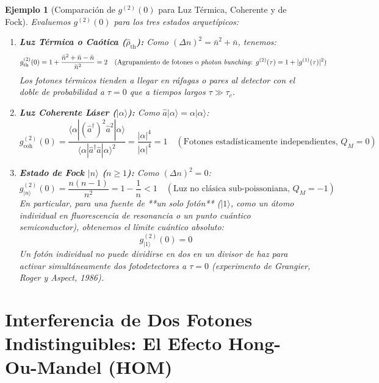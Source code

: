 \documentclass[11pt,a4paper]{book}
\newtheorem{ejemplo}{Ejemplo}[chapter]
\begin{document}
\begin{ejemplo}[Comparación de $g^{(2)}(0)$ para Luz Térmica, Coherente y de Fock]
Evaluemos $g^{(2)}(0)$ para los tres estados arquetípicos:
\begin{enumerate}
    \item \textbf{Luz Térmica o Caótica ($\hat{\rho}_{\text{th}}$):} Como $(\Delta n)^2 = \bar{n}^2 + \bar{n}$, tenemos:
    \[
    g^{(2)}_{\text{th}}(0) = 1 + \frac{\bar{n}^2 + \bar{n} - \bar{n}}{\bar{n}^2} = 2 \quad (\text{Agrupamiento de fotones o \textit{photon bunching}: } g^{(2)}(\tau) = 1 + |g^{(1)}(\tau)|^2)
    \]
    Los fotones térmicos tienden a llegar en ráfagas o pares al detector con el doble de probabilidad a $\tau=0$ que a tiempos largos $\tau \gg \tau_c$.
    \item \textbf{Luz Coherente Láser ($|\alpha\rangle$):} Como $\hat{a}|\alpha\rangle = \alpha|\alpha\rangle$:
    \[
    g^{(2)}_{\text{coh}}(0) = \frac{\langle \alpha | (\hat{a}^\dagger)^2 \hat{a}^2 | \alpha \rangle}{\langle \alpha | \hat{a}^\dagger \hat{a} | \alpha \rangle^2} = \frac{|\alpha|^4}{|\alpha|^4} = 1 \quad (\text{Fotones estadísticamente independientes, } Q_M = 0)
    \]
    \item \textbf{Estado de Fock $|n\rangle$ ($n \geq 1$):} Como $(\Delta n)^2 = 0$:
    \[
    g^{(2)}_{|n\rangle}(0) = \frac{n(n-1)}{n^2} = 1 - \frac{1}{n} < 1 \quad (\text{Luz no clásica sub-poissoniana, } Q_M = -1)
    \]
    En particular, para una fuente de **un solo fotón** ($|1\rangle$, como un átomo individual en fluorescencia de resonancia o un punto cuántico semiconductor), obtenemos el límite cuántico absoluto:
    \[
    g^{(2)}_{|1\rangle}(0) = 0
    \]
    Un fotón individual no puede dividirse en dos en un divisor de haz para activar simultáneamente dos fotodetectores a $\tau=0$ (experimento de Grangier, Roger y Aspect, 1986).
\end{enumerate}
\end{ejemplo}

\section[Efecto Hong-Ou-Mandel]{Interferencia de Dos Fotones Indistinguibles: El Efecto Hong-Ou-Mandel (HOM)}
\end{document}
